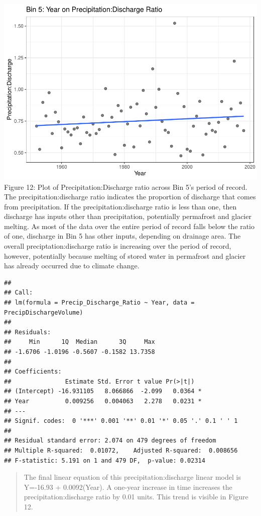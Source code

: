 \documentclass[12pt,]{article}
\begin{document}
\includegraphics{Project_Report_v2_files/figure-latex/unnamed-chunk-9-1.pdf}
Figure 12: Plot of Precipitation:Discharge ratio across Bin 5's period
of record. The precipitation:discharge ratio indicates the proportion of
discharge that comes from precipitation. If the precipitation:discharge
ratio is less than one, then discharge has inputs other than
precipitation, potentially permafrost and glacier melting. As most of
the data over the entire period of record falls below the ratio of one,
discharge in Bin 5 has other inputs, depending on drainage area. The
overall preciptation:discharge ratio is increasing over the period of
record, however, potentially because melting of stored water in
permafrost and glacier has already occurred due to climate change.

\begin{verbatim}
## 
## Call:
## lm(formula = Precip_Discharge_Ratio ~ Year, data = PrecipDischargeVolume)
## 
## Residuals:
##     Min      1Q  Median      3Q     Max 
## -1.6706 -1.0196 -0.5607 -0.1582 13.7358 
## 
## Coefficients:
##               Estimate Std. Error t value Pr(>|t|)  
## (Intercept) -16.931105   8.066866  -2.099   0.0364 *
## Year          0.009256   0.004063   2.278   0.0231 *
## ---
## Signif. codes:  0 '***' 0.001 '**' 0.01 '*' 0.05 '.' 0.1 ' ' 1
## 
## Residual standard error: 2.074 on 479 degrees of freedom
## Multiple R-squared:  0.01072,    Adjusted R-squared:  0.008656 
## F-statistic: 5.191 on 1 and 479 DF,  p-value: 0.02314
\end{verbatim}

\begin{quote}
The final linear equation of this precipitation:discharge linear model
is Y=-16.93 + 0.0092(Year). A one-year increase in time increases the
precipitation:discharge ratio by 0.01 units. This trend is visible in
Figure 12.
\end{quote}
\end{document}
